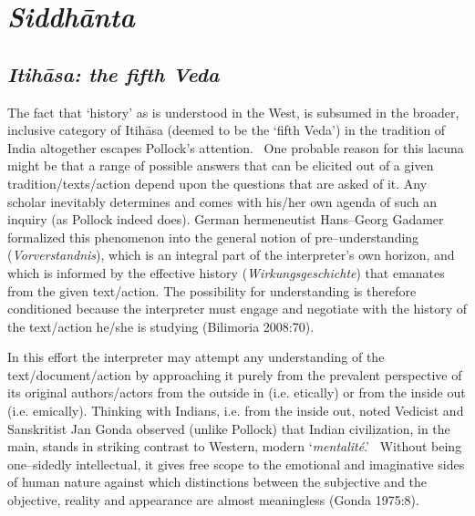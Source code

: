 \section*{\textit{Siddhānta}}

\subsection*{\textit{Itihāsa: the fifth Veda}}

The fact that ‘history’ as is understood in the West, is subsumed in the broader, inclusive category of Itihāsa (deemed to be the ‘fifth Veda’) in the tradition of India altogether escapes Pollock’s attention.  One probable reason for this lacuna might be that a range of possible answers that can be elicited out of a given tradition/texts/action depend upon the questions that are asked of it. Any scholar inevitably determines and comes with his/her own agenda of such an inquiry (as Pollock indeed does). German hermeneutist Hans–Georg Gadamer formalized this phenomenon into the general notion of pre–understanding (\textit{Vorverstandnis}), which is an integral part of the interpreter’s own horizon, and which is informed by the effective history (\textit{Wirkungsgeschichte}) that emanates from the given text/action. The possibility for understanding is therefore conditioned because the interpreter must engage and negotiate with the history of the text/action he/she is studying (Bilimoria 2008:70).

In this effort the interpreter may attempt any understanding of the text/document/action by approaching it purely from the prevalent perspective of its original authors/actors from the outside in (i.e. etically) or from the inside out (i.e. emically). Thinking with Indians, i.e. from the inside out, noted Vedicist and Sanskritist Jan Gonda observed (unlike Pollock) that Indian civilization, in the main, stands in striking contrast to Western, modern ‘\textit{mentalité}.'  Without being one–sidedly intellectual, it gives free scope to the emotional and imaginative sides of human nature against which distinctions between the subjective and the objective, reality and appearance are almost meaningless (Gonda 1975:8).

